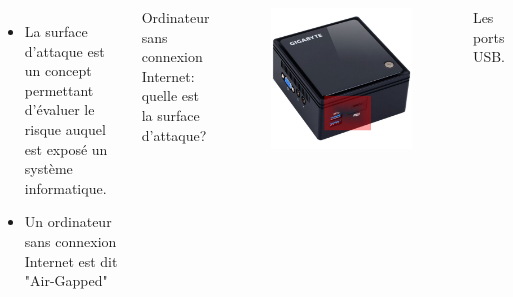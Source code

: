 \begin{frame}
\begin{columns}
\begin{itemize}
    \item La surface d'attaque est un concept permettant d'évaluer le risque auquel est exposé un système informatique.
    \item Un ordinateur sans connexion Internet est dit "Air-Gapped"
\end{itemize}
Ordinateur sans connexion Internet: quelle est la surface d'attaque?
\begin{figure}
\includegraphics[scale=0.15]{res/brix2}
\end{figure}
Les ports USB.
\end{columns}


\end{frame}

